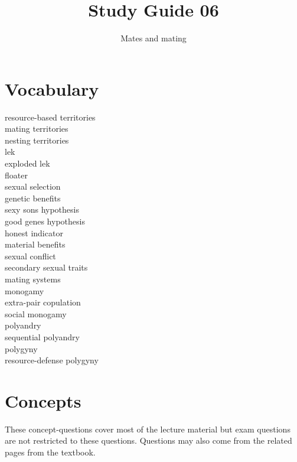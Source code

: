 \documentclass[nofonts, letterpaper]{tufte-handout}
\title{Study Guide 06}
\author{Mates and mating}
\date{} %
\begin{document}
\maketitle	%


\section{Vocabulary}
\vspace{-1\baselineskip}
\begin{multicols}{2}
resource-based territories \\
mating territories \\
nesting territories \\
lek \\
exploded lek \\
floater  \\
sexual selection \\
genetic benefits \\
sexy sons hypothesis \\
good genes hypothesis \\
honest indicator \\
material benefits \\
sexual conflict \\
secondary sexual traits \\
mating systems \\
monogamy \\
extra-pair copulation \\
social monogamy \\
polyandry \\
sequential polyandry \\
polygyny \\
resource-defense polygyny 
\end{multicols}

\section{Concepts}

These concept-questions cover most of the lecture material but exam questions are not restricted to these questions. Questions may also come from the related pages from the textbook.\vspace{\baselineskip}
\end{document}

